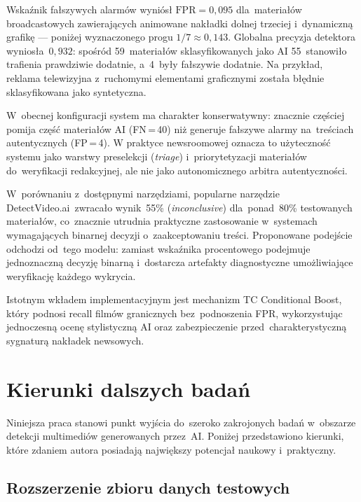 Wska\'{z}nik fa\l{}szywych alarm\'{o}w wyni\'{o}s\l{}
$\mathrm{FPR} = 0{,}095$ dla~materia\l{}\'{o}w broadcastowych zawieraj\k{a}cych
animowane nak\l{}adki dolnej trzeciej i~dynamiczn\k{a} grafik\k{e} --- poni\.{z}ej
wyznaczonego progu $1/7 \approx 0{,}143$.
Globalna precyzja detektora wynios\l{}a~$0{,}932$: spo\'{s}r\'{o}d 59~materia\l{}\'{o}w
sklasyfikowanych jako AI 55~stanowi\l{}o trafienia prawdziwie dodatnie,
a~4~by\l{}y fa\l{}szywie dodatnie.
Na przyk\l{}ad, reklama telewizyjna z~ruchomymi elementami graficznymi zosta\l{}a
b\l{}\k{e}dnie sklasyfikowana jako syntetyczna.

W~obecnej konfiguracji system ma charakter konserwatywny:
znacznie częściej pomija część materiałów AI (FN\,=\,40)
niż generuje fałszywe alarmy na~treściach autentycznych (FP\,=\,4).
W praktyce newsroomowej oznacza to użyteczność systemu jako warstwy preselekcji
(\textit{triage}) i~priorytetyzacji materiałów do~weryfikacji redakcyjnej,
ale nie jako autonomicznego arbitra autentyczności.

W~por\'{o}wnaniu z~dost\k{e}pnymi narz\k{e}dziami, popularne narz\k{e}dzie
DetectVideo.ai~zwraca\l{}o wynik~55\% (\textit{inconclusive}) dla~ponad~80\%
testowanych materia\l{}\'{o}w, co~znacznie utrudnia praktyczne zastosowanie
w~systemach wymagaj\k{a}cych binarnej decyzji o~zaakceptowaniu tre\'{s}ci.
Proponowane podej\'{s}cie odchodzi od~tego modelu:
zamiast wska\'{z}nika procentowego podejmuje jednoznaczn\k{a} decyzj\k{e}
binarn\k{a} i~dostarcza artefakty diagnostyczne umo\.{z}liwiaj\k{a}ce
weryfikacj\k{e} ka\.{z}dego wykrycia.

Istotnym wk\l{}adem implementacyjnym jest mechanizm TC Conditional Boost,
kt\'{o}ry podnosi recall film\'{o}w granicznych bez~podnoszenia FPR,
wykorzystuj\k{a}c jednoczesn\k{a} ocen\k{e} stylistyczn\k{a} AI
oraz zabezpieczenie przed~charakterystyczn\k{a} sygnatur\k{a} nak\l{}adek newsowych.

\section{Kierunki dalszych bada\'{n}}

Niniejsza praca stanowi punkt wyj\'{s}cia do~szeroko zakrojonych bada\'{n}
w~obszarze detekcji multimedi\'{o}w generowanych przez~AI.
Poni\.{z}ej przedstawiono kierunki, kt\'{o}re zdaniem autora posiadaj\k{a}
najwi\k{e}kszy potencja\l{} naukowy i~praktyczny.

\subsection{Rozszerzenie zbioru danych testowych}

